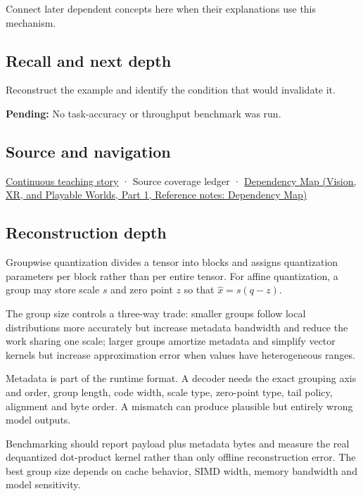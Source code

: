 \hypertarget{appendix-638204c40e8b-used-by}{}

Connect later dependent concepts here when their explanations use this mechanism.

\subsection{Recall and next depth}\label{appendix-638204c40e8b-recall-and-next-depth}

\hypertarget{appendix-638204c40e8b-recall-and-next-depth}{}

Reconstruct the example and identify the condition that would invalidate it.

\textbf{Pending:} No task-accuracy or throughput benchmark was run.

\subsection{Source and navigation}\label{appendix-638204c40e8b-source-and-navigation}

\hypertarget{appendix-638204c40e8b-source-and-navigation}{}

\hyperref[01-foundations-i-ch001-choosing-what-information-to-keep]{Continuous teaching story} · {Source coverage ledger} · \href{../07-Vision-XR-and-Playable-Worlds-P01/main.pdf\#nameddest=appendix-4ad47bdd269a}{Dependency Map (Vision, XR, and Playable Worlds, Part 1, Reference notes: Dependency Map)}

\subsection{Reconstruction depth}\label{appendix-638204c40e8b-reconstruction-depth}

\hypertarget{appendix-638204c40e8b-reconstruction-depth}{}

Groupwise quantization divides a tensor into blocks and assigns quantization parameters per block rather than per entire tensor. For affine quantization, a group may store scale \(s\) and zero point \(z\) so that \(\hat x=s(q-z)\).

The group size controls a three-way trade: smaller groups follow local distributions more accurately but increase metadata bandwidth and reduce the work sharing one scale; larger groups amortize metadata and simplify vector kernels but increase approximation error when values have heterogeneous ranges.

Metadata is part of the runtime format. A decoder needs the exact grouping axis and order, group length, code width, scale type, zero-point type, tail policy, alignment and byte order. A mismatch can produce plausible but entirely wrong model outputs.

Benchmarking should report payload plus metadata bytes and measure the real dequantized dot-product kernel rather than only offline reconstruction error. The best group size depends on cache behavior, SIMD width, memory bandwidth and model sensitivity.
